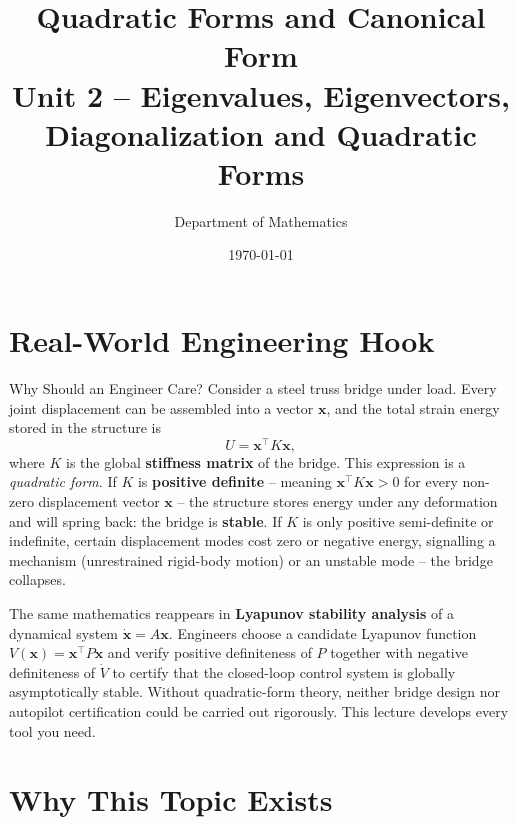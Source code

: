 \documentclass[12pt,a4paper]{article}
\title{\textbf{Quadratic Forms and Canonical Form} \\ \large Unit 2 -- Eigenvalues, Eigenvectors, Diagonalization and Quadratic Forms}
\author{Department of Mathematics}
\date{\today}
\begin{document}
\maketitle
\tableofcontents
\newpage

\section{Real-World Engineering Hook}

\begin{curiositybox}{Why Should an Engineer Care?}
Consider a steel truss bridge under load. Every joint displacement can be assembled into a vector $\mathbf{x}$, and the total strain energy stored in the structure is
\[
  U = \mathbf{x}^{\top} K \mathbf{x},
\]
where $K$ is the global \textbf{stiffness matrix} of the bridge. This expression is a \emph{quadratic form}. If $K$ is \textbf{positive definite} -- meaning $\mathbf{x}^{\top} K \mathbf{x} > 0$ for every non-zero displacement vector $\mathbf{x}$ -- the structure stores energy under any deformation and will spring back: the bridge is \textbf{stable}. If $K$ is only positive semi-definite or indefinite, certain displacement modes cost zero or negative energy, signalling a mechanism (unrestrained rigid-body motion) or an unstable mode -- the bridge collapses.

The same mathematics reappears in \textbf{Lyapunov stability analysis} of a dynamical system $\dot{\mathbf{x}} = A\mathbf{x}$. Engineers choose a candidate Lyapunov function $V(\mathbf{x}) = \mathbf{x}^{\top} P \mathbf{x}$ and verify positive definiteness of $P$ together with negative definiteness of $\dot{V}$ to certify that the closed-loop control system is globally asymptotically stable. Without quadratic-form theory, neither bridge design nor autopilot certification could be carried out rigorously. This lecture develops every tool you need.
\end{curiositybox}

\section{Why This Topic Exists}
\end{document}
